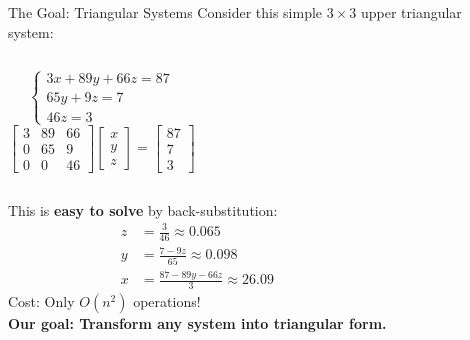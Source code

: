 \documentclass[aspectratio=169]{beamer}
\begin{document}
\begin{frame}{The Goal: Triangular Systems}
	\noindent Consider this simple $3 \times 3$ \alert{upper triangular} system:
	\vspace{0.5cm}

	\begin{columns}
		\begin{equation*}
			\begin{cases}
				3x + 89y + 66z = 87 \\
				65y + 9z = 7        \\
				46z = 3
			\end{cases}
		\end{equation*}
		\begin{equation*}
			\begin{bmatrix}
				3 & 89 & 66 \\
				0 & 65 & 9  \\
				0 & 0  & 46
			\end{bmatrix}
			\begin{bmatrix}
				x \\ y \\ z
			\end{bmatrix} =
			\begin{bmatrix}
				87 \\ 7 \\ 3
			\end{bmatrix}
		\end{equation*}
	\end{columns}

	\vspace{0.3cm}
	\begin{columns}
		\column{0.5\textwidth}
		\small{This is \textbf{easy to solve} by \alert{back-substitution}}:
		\begin{align*}
			z & = \frac{3}{46} \approx 0.065             \\
			y & = \frac{7 - 9z}{65} \approx 0.098        \\
			x & = \frac{87 - 89y - 66z}{3} \approx 26.09
		\end{align*}
		\column{0.5\textwidth}
		Cost: Only $O(n^2)$ operations!\\
		\textcolor{WildStrawberry}{\textbf{Our goal: Transform any system into triangular form.}}
	\end{columns}
\end{frame}
\end{document}
